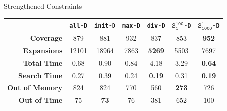 \documentclass[aspectratio=169, xcolor=dvipsnames]{beamer}
\begin{document}
    \begin{frame}[c]{Strengthened Constraints}
        \begin{table}[h!]
            \center
            \begin{tabular}{|r|c|c|c|c|c|c|}
                \hline
                & \textbf{\texttt{all-D}} & \textbf{\texttt{init-D}} & \textbf{\texttt{max-D}} & \textbf{\texttt{div-D}} & \textbf{$\texttt{S}_{\texttt{1}}^{\texttt{100}}$\texttt{-D}}& \textbf{$\texttt{S}_{\texttt{1000}}^{\texttt{1}}$\texttt{-D}}\\
                \hline \hline
                \textbf{Coverage}       & 879 & 881 & 932 & 837 & 853 & \textbf{952}  \\ \hline
                \textbf{Expansions}     & 12101 & 18964 & 7863 & \textbf{5269} & 5503 & 7697          \\ \hline
                \textbf{Total Time}     & 0.68 & 0.90 & 0.84 & 4.18 & 3.29 & \textbf{0.64} \\ \hline
                \textbf{Search Time}    & 0.27 & 0.39 & 0.24 & \textbf{0.19} & 0.31 & \textbf{0.19} \\ \hline
                \textbf{Out of Memory}  & 824 & 824 & 770 & 560 & \textbf{273}  & 726           \\ \hline
                \textbf{Out of Time}    & 75 & \textbf{73}   & 76 & 381 & 652 & 100           \\ \hline
            \end{tabular}
        \end{table}
    \end{frame}
\end{document}
